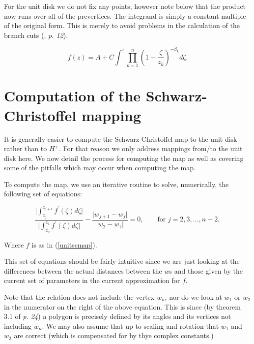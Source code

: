 \documentclass[a4paper,10pt]{amsart}
\newcommand{\sch}{Schwarz-Christoffel }
\begin{document}
For the unit disk we do not fix any points, however note below that the product now runs over all of the prevertices. The integrand is simply a constant multiple of the original form. This is merely to avoid problems in the calculation of the branch cuts (\cite{driscoll}, \emph{p. 12}).

\begin{equation}
\label{unitscmap}
f(z) = A + C \int^z \prod_{k=1}^{n} (1 - \frac{\zeta}{z_k})^{-\beta_k} d\zeta.
\end{equation}






\section{Computation of the \sch mapping}

It is generally easier to compute the \sch map to the unit disk rather than to $H^+$. For that reason we only address mappings from/to the unit disk here. We now detail the process for computing the map as well as covering some of the pitfalls which may occur when computing the map.

To compute the map, we use an iterative routine to solve, numerically, the following set of equations:

\begin{equation}
\label{optimizeme}
\frac{\vert \int_{z_j}^{z_{j+1}} f^\prime(\zeta) d\zeta \vert}{\vert \int_{z_2}^{z_{1}} f^\prime(\zeta) d\zeta\vert} - \frac{\vert w_{j+1} - w_j\vert}{\vert w_2 - w_1\vert} = 0, \qquad \text{for } j=2,3,\dots,n-2,
\end{equation}

Where $f$ is as in (\ref{unitscmap}).

This set of equations should be fairly intuitive since we are just looking at the differences between the actual distances between the $w$s and those given by the current set of parameters in the current approximation for $f$.

Note that the relation does not include the vertex $w_n$, nor do we look at $w_1$ or $w_2$ in the numerator on the right of the above equation. This is since (by theorem 3.1 of \cite{driscoll} \emph{p. 24}) a polygon is precisely defined by its angles and its vertices not including $w_n$. We may also assume that up to scaling and rotation that $w_1$ and $w_2$ are correct (which is compensated for by thye complex constants.)
\end{document}
